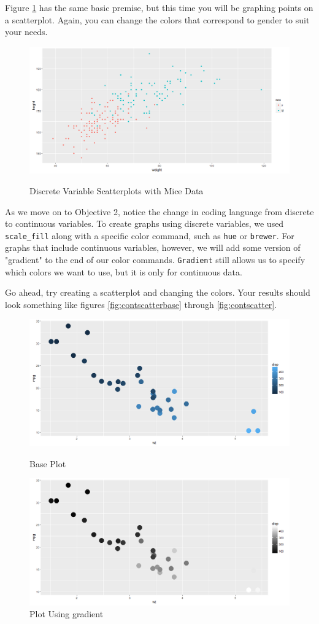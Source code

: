\noindent Figure \ref{fig:mice.base} has the same basic premise, but this time you will be graphing points on a scatterplot.
Again, you can change the colors that correspond to gender to suit your needs.

\begin{figure}[htbp!]
   \centering
      \caption{Discrete Variable Scatterplots with Mice Data}
   \includegraphics[width=.5\textwidth]{pictures/ggplot2/micebase.png} 
   \label{fig:mice.base}
\end{figure} 

\noindent As we move on to Objective 2, notice the change in coding language from discrete to continuous variables.
To create graphs using discrete variables, we used \texttt{scale\_fill} along with a specific color command, such as \texttt{hue} or \texttt{brewer}.
For graphs that include continuous variables, however, we will add some version of "gradient" to the end of our color commands.
\texttt{Gradient} still allows us to specify which colors we want to use, but it is only for continuous data.\medskip

Go ahead, try creating a scatterplot and changing the colors. Your results should look something like figures \ref{fig:contscatterbase} through \ref{fig:contscatter}.\medskip


\begin{figure}[htbp!]
\centering
\begin{minipage}{.5\textwidth}
  \centering
  \includegraphics[width=.5\textwidth]{pictures/ggplot2/contscatterbase.png}
  \caption{Base Plot}
  \label{fig:contscatterbase}
\end{minipage}%
\begin{minipage}{.5\textwidth}
  \centering
  \includegraphics[width=.5\textwidth]{pictures/ggplot2/contscattergrey.png}
  \caption{Plot Using gradient}
  \label{fig:contscattergrey}
\end{minipage}
\end{figure}

